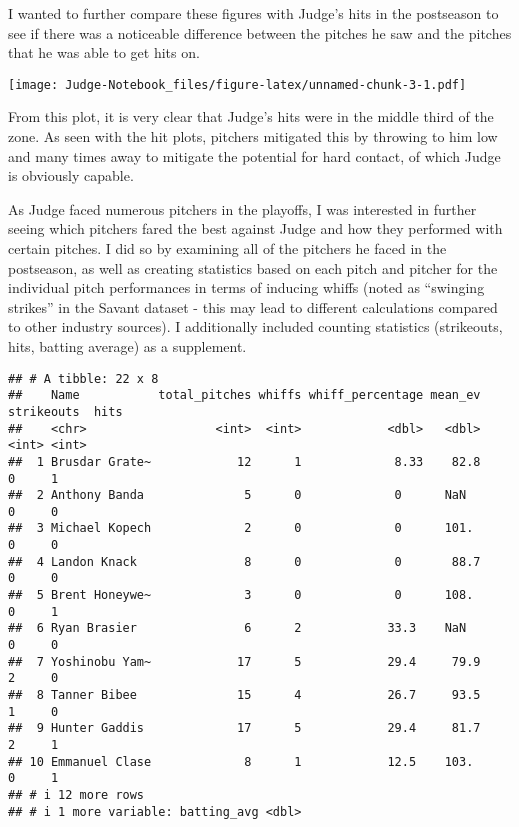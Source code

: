 \documentclass[
]{article}
\begin{document}
I wanted to further compare these figures with Judge's hits in the
postseason to see if there was a noticeable difference between the
pitches he saw and the pitches that he was able to get hits on.

\texttt{[image: Judge-Notebook\_files/figure-latex/unnamed-chunk-3-1.pdf]}

From this plot, it is very clear that Judge's hits were in the middle
third of the zone. As seen with the hit plots, pitchers mitigated this
by throwing to him low and many times away to mitigate the potential for
hard contact, of which Judge is obviously capable.

As Judge faced numerous pitchers in the playoffs, I was interested in
further seeing which pitchers fared the best against Judge and how they
performed with certain pitches. I did so by examining all of the
pitchers he faced in the postseason, as well as creating statistics
based on each pitch and pitcher for the individual pitch performances in
terms of inducing whiffs (noted as ``swinging strikes'' in the Savant
dataset - this may lead to different calculations compared to other
industry sources). I additionally included counting statistics
(strikeouts, hits, batting average) as a supplement.

\begin{verbatim}
## # A tibble: 22 x 8
##    Name           total_pitches whiffs whiff_percentage mean_ev strikeouts  hits
##    <chr>                  <int>  <int>            <dbl>   <dbl>      <int> <int>
##  1 Brusdar Grate~            12      1             8.33    82.8          0     1
##  2 Anthony Banda              5      0             0      NaN            0     0
##  3 Michael Kopech             2      0             0      101.           0     0
##  4 Landon Knack               8      0             0       88.7          0     0
##  5 Brent Honeywe~             3      0             0      108.           0     1
##  6 Ryan Brasier               6      2            33.3    NaN            0     0
##  7 Yoshinobu Yam~            17      5            29.4     79.9          2     0
##  8 Tanner Bibee              15      4            26.7     93.5          1     0
##  9 Hunter Gaddis             17      5            29.4     81.7          2     1
## 10 Emmanuel Clase             8      1            12.5    103.           0     1
## # i 12 more rows
## # i 1 more variable: batting_avg <dbl>
\end{verbatim}
\end{document}
